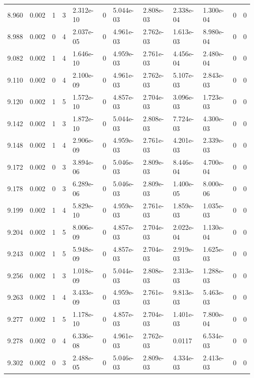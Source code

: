 \documentclass[preview]{standalone}
\begin{document}
{{{{{{{{{{{{\begin{tabular}{L{1.2cm}C{1.2cm} C{0.3cm}C{0.5cm} C{1.4cm}C{1.4cm} C{1.4cm}C{1.4cm} C{1.6cm}C{1.6cm} C{1.6cm}C{1.6cm}}
  8.960  &  0.002  & 1     &  3 &  2.312e-10  & 0  &  5.044e-03&   2.808e-03& 2.338e-04 & 1.300e-04   &  0 & 0  \\ 
  8.988  &  0.002  & 0     &  4 &  2.037e-05  & 0  &  4.961e-03&   2.762e-03& 1.613e-03 & 8.980e-04   &  0 & 0  \\ 
  9.082  &  0.002  & 1     &  4 &  1.646e-10  & 0  &  4.959e-03&   2.761e-03& 4.456e-04 & 2.480e-04   &  0 & 0  \\ 
  9.110  &  0.002  & 0     &  4 &  2.100e-09  & 0  &  4.961e-03&   2.762e-03& 5.107e-03 & 2.843e-03   &  0 & 0  \\ 
  9.120  &  0.002  & 1     &  5 &  1.572e-10  & 0  &  4.857e-03&   2.704e-03& 3.096e-03 & 1.723e-03   &  0 & 0  \\ 
  9.142  &  0.002  & 1     &  3 &  1.872e-10  & 0  &  5.044e-03&   2.808e-03& 7.724e-03 & 4.300e-03   &  0 & 0  \\ 
  9.148  &  0.002  & 1     &  4 &  2.906e-09  & 0  &  4.959e-03&   2.761e-03& 4.201e-03 & 2.339e-03   &  0 & 0  \\ 
  9.172  &  0.002  & 0     &  3 &  3.894e-06  & 0  &  5.046e-03&   2.809e-03& 8.446e-04 & 4.700e-04   &  0 & 0  \\ 
  9.178  &  0.002  & 0     &  3 &  6.289e-06  & 0  &  5.046e-03&   2.809e-03& 1.400e-05 & 8.000e-06   &  0 & 0  \\ 
  9.199  &  0.002  & 1     &  4 &  5.829e-10  & 0  &  4.959e-03&   2.761e-03& 1.859e-03 & 1.035e-03   &  0 & 0  \\ 
  9.204  &  0.002  & 1     &  5 &  8.006e-09  & 0  &  4.857e-03&   2.704e-03& 2.022e-04 & 1.130e-04   &  0 & 0  \\ 
  9.243  &  0.002  & 1     &  5 &  5.948e-09  & 0  &  4.857e-03&   2.704e-03& 2.919e-03 & 1.625e-03   &  0 & 0  \\ 
  9.256  &  0.002  & 1     &  3 &  1.018e-09  & 0  &  5.044e-03&   2.808e-03& 2.313e-03 & 1.288e-03   &  0 & 0  \\ 
  9.263  &  0.002  & 1     &  4 &  3.433e-09  & 0  &  4.959e-03&   2.761e-03& 9.813e-03 & 5.463e-03   &  0 & 0  \\ 
  9.277  &  0.002  & 1     &  5 &  1.178e-10  & 0  &  4.857e-03&   2.704e-03& 1.401e-03 & 7.800e-04   &  0 & 0  \\ 
  9.278  &  0.002  & 0     &  4 &  6.336e-08  & 0  &  4.961e-03&   2.762e-03& 0.0117 & 6.534e-03   &  0 & 0  \\ 
  9.302  &  0.002  & 0     &  3 &  2.488e-05  & 0  &  5.046e-03&   2.809e-03& 4.334e-03 & 2.413e-03   &  0 & 0  \\ 

\end{tabular}}}}}}}}}}}}}
\end{document}
